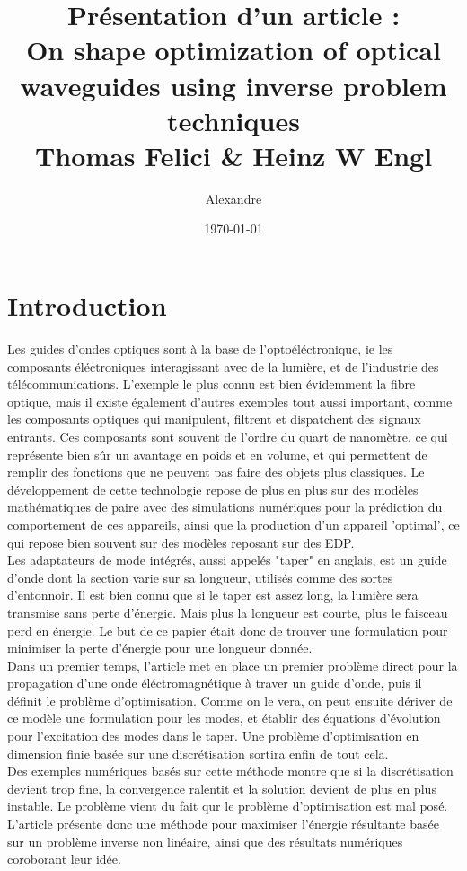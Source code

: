 \documentclass{article}
\title{Pr\'esentation d'un article : \\ On shape optimization of optical waveguides using inverse problem techniques\\\small{Thomas Felici \& Heinz W Engl}}
\author{Alexandre \bsc{Vieira}}
\date{\today}
\begin{document}
\maketitle
\tableofcontents

\newpage

\section*{Introduction}
Les guides d'ondes optiques sont à la base de l'optoéléctronique, ie les composants éléctroniques interagissant avec de la lumière, et de l'industrie des télécommunications. L'exemple le plus connu est bien évidemment la fibre optique, mais il existe également d'autres exemples tout aussi important, comme les composants optiques qui manipulent, filtrent et dispatchent des signaux entrants. Ces composants sont souvent de l'ordre du quart de nanomètre, ce qui représente bien sûr un avantage en poids et en volume, et qui permettent de remplir des fonctions que ne peuvent pas faire des objets plus classiques. Le développement de cette technologie repose de plus en plus sur des modèles mathématiques de paire avec des simulations numériques pour la prédiction du comportement de ces appareils, ainsi que la production d'un appareil 'optimal', ce qui repose bien souvent sur des modèles reposant sur des EDP.\\
Les adaptateurs de mode intégrés, aussi appelés "taper" en anglais, est un guide d'onde dont la section varie sur sa longueur, utilisés comme des sortes d'entonnoir. Il est bien connu que si le taper est assez long, la lumière sera transmise sans perte d'énergie. Mais plus la longueur est courte, plus le faisceau perd en énergie. Le but de ce papier était donc de trouver une formulation pour minimiser la perte d'énergie pour une longueur donnée.\\
Dans un premier temps, l'article met en place un premier problème direct pour la propagation d'une onde éléctromagnétique à traver un guide d'onde, puis il définit le problème d'optimisation. Comme on le vera, on peut ensuite dériver de ce modèle une formulation pour les modes, et établir des équations d'évolution pour l'excitation des modes dans le taper. Une problème d'optimisation en dimension finie basée sur une discrétisation sortira enfin de tout cela. \\
Des exemples numériques basés sur cette méthode montre que si la discrétisation devient trop fine, la convergence ralentit et la solution devient de plus en plus instable. Le problème vient du fait qur le problème d'optimisation est mal posé. L'article présente donc une méthode pour maximiser l'énergie résultante basée sur un problème inverse non linéaire, ainsi que des résultats numériques coroborant leur idée. 
\end{document}
